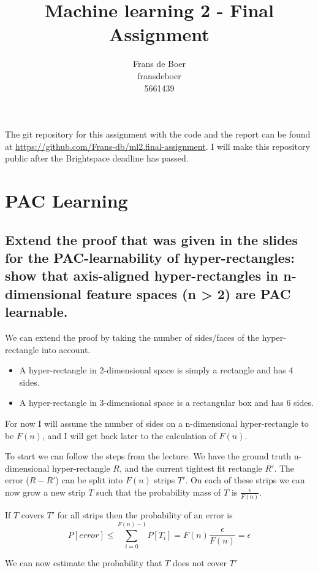\documentclass[11pt,a4paper]{article}
\title{Machine learning 2 - Final Assignment}
\author{
    Frans de Boer \\
    fransdeboer \\
    5661439 \\
}
\begin{document}
\maketitle

The git repository for this assignment with the code and the report can be found at \url{https://github.com/Frans-db/ml2.final-assignment}. I will make this repository public after the Brightspace deadline has passed.

\section{PAC Learning}

\subsection{Extend the proof that was given in the slides for the PAC-learnability of hyper-rectangles:
show that axis-aligned hyper-rectangles in n-dimensional feature spaces (n > 2) are PAC
learnable.}
  
We can extend the proof by taking the number of sides/faces of the hyper-rectangle into account.
\begin{itemize}
    \item A hyper-rectangle in 2-dimensional space is simply a rectangle and has 4 sides.
    \item A hyper-rectangle in 3-dimensional space is a rectangular box and has 6 sides.
\end{itemize}
For now I will assume the number of sides on a n-dimensional hyper-rectangle to be $F(n)$, and I will get back later to the calculation of $F(n)$.

To start we can follow the steps from the lecture. We have the ground truth n-dimensional hyper-rectangle $R$, and the current tightest fit rectangle $R'$. The error ($R - R'$) can be split into $F(n)$ strips $T'$. On each of these strips we can now grow a new strip $T$ such that the probability mass of $T$ is $\frac{\epsilon}{F(n)}$.

If $T$ covers $T'$ for all strips then the probability of an error is
\begin{equation}
    \label{eq:total_error}
    P[error] \leq \sum_{i=0}^{F(n)-1}P[T_i] = F(n)\frac{\epsilon}{F(n)} = \epsilon
\end{equation}

We can now estimate the probability that $T$ does not cover $T'$
\end{document}

